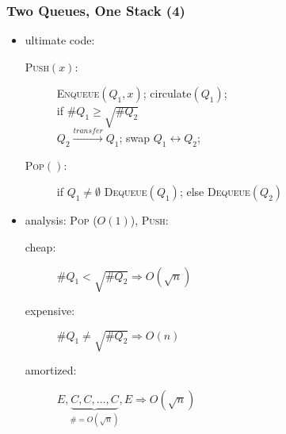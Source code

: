 \documentclass{beamer}
\begin{document}
\begin{frame}
  \frametitle{Two Queues, One Stack (4)}
  
  \begin{itemize}
    \setlength{\itemsep}{10pt}
    \item ultimate code:
        \begin{description}
          \item [\textsc{Push$(x)$}:] \textsc{Enqueue$(Q_1,x)$};
          circulate$(Q_1)$; \\
          if $\#Q_1 \geq \sqrt{\#Q_2}$ \\ 
          $Q_2 \xrightarrow{transfer} Q_1$; swap $Q_1 \leftrightarrow Q_2$;
          \item [\textsc{Pop$()$}:] if $Q_1 \neq \emptyset$
          \textsc{Dequeue$(Q_1)$}; else \textsc{Dequeue$(Q_2)$} 
        \end{description}  
	\item analysis: \textsc{Pop} ($O(1)$), \textsc{Push}:
	  \begin{description}
	    \item[cheap:] $\#Q_1 < \sqrt{\#Q_2} \Rightarrow O(\sqrt{n})$
	    \item[expensive:] $\#Q_1 \neq \sqrt{\#Q_2} \Rightarrow O(n)$
	    \item[amortized:] $E, \underbrace{C, C, \ldots, C}_{\# = O(\sqrt{n})}, E
	    \Rightarrow O(\sqrt{n})$
	  \end{description}
  \end{itemize}
\end{frame}
% 
%   
%   
\end{document}
